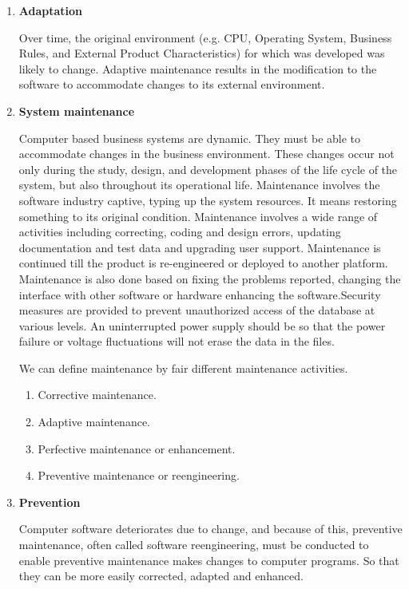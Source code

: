 \begin{enumerate}
\item {\bf Adaptation }

Over time, the original environment (e.g. CPU, Operating System, Business Rules, and External Product Characteristics) for which was developed was likely to change. Adaptive maintenance results in the modification to the software to accommodate changes to its external environment.

\item {\bf System maintenance}

Computer based business systems are dynamic. They must be able to accommodate changes in the business environment. These changes occur not only during the study, design, and development phases of the life cycle of the system, but also throughout its operational life. Maintenance involves the software industry captive, typing up the system resources. It means restoring something to its original condition. Maintenance involves a wide range of activities including correcting, coding and design errors, updating documentation and test data and upgrading user support. Maintenance is continued till the product is re-engineered or deployed to another platform. Maintenance is also done based on fixing the problems reported, changing the interface with other software or hardware enhancing the software.Security measures are provided to prevent unauthorized access of the database at various levels. An uninterrupted power supply should be so that the power failure or voltage fluctuations will not erase the data in the files. 

We can define maintenance by fair different maintenance activities.
\begin {enumerate}
\item Corrective maintenance.
\item Adaptive maintenance.
\item Perfective maintenance or enhancement.
\item Preventive maintenance or reengineering.
\end{enumerate}

\item {\bf Prevention}

Computer software deteriorates due to change, and because of this, preventive maintenance, often called software reengineering, must be conducted to enable preventive maintenance makes changes to computer programs. So that they can be more easily corrected, adapted and enhanced.
\end{enumerate}
  
